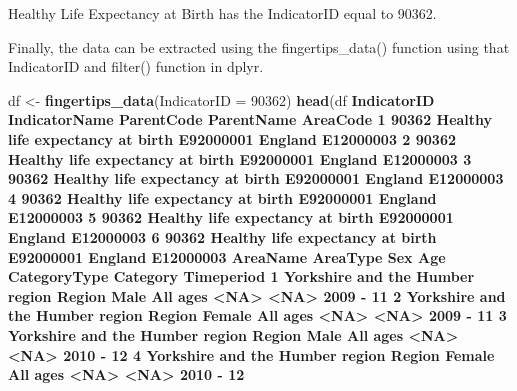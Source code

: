 \documentclass[]{book}
\newenvironment{Shaded}{\begin{snugshade}}{\end{snugshade}}
\newcommand{\DataTypeTok}[1]{\textcolor[rgb]{0.13,0.29,0.53}{#1}}
\newcommand{\DecValTok}[1]{\textcolor[rgb]{0.00,0.00,0.81}{#1}}
\newcommand{\ErrorTok}[1]{\textcolor[rgb]{0.64,0.00,0.00}{\textbf{#1}}}
\newcommand{\KeywordTok}[1]{\textcolor[rgb]{0.13,0.29,0.53}{\textbf{#1}}}
\newcommand{\NormalTok}[1]{#1}
\newcommand{\OperatorTok}[1]{\textcolor[rgb]{0.81,0.36,0.00}{\textbf{#1}}}
\newcommand{\OtherTok}[1]{\textcolor[rgb]{0.56,0.35,0.01}{#1}}
\newcommand{\StringTok}[1]{\textcolor[rgb]{0.31,0.60,0.02}{#1}}
\begin{document}
Healthy Life Expectancy at Birth has the IndicatorID equal to 90362.

Finally, the data can be extracted using the fingertips\_data() function using that IndicatorID and filter() function in dplyr.

\begin{Shaded}
\begin{Highlighting}[]
\NormalTok{df <-}\StringTok{ }\KeywordTok{fingertips_data}\NormalTok{(}\DataTypeTok{IndicatorID =} \DecValTok{90362}\NormalTok{)}
\KeywordTok{head}\NormalTok{(df }\OperatorTok{%>%}\StringTok{ }\KeywordTok{filter}\NormalTok{(AreaName }\OperatorTok{==}\StringTok{ "Yorkshire and the Humber region"}\NormalTok{))}
\NormalTok{  IndicatorID                    IndicatorName ParentCode ParentName  AreaCode}
\DecValTok{1}       \DecValTok{90362}\NormalTok{ Healthy life expectancy at birth  E92000001    England E12000003}
\DecValTok{2}       \DecValTok{90362}\NormalTok{ Healthy life expectancy at birth  E92000001    England E12000003}
\DecValTok{3}       \DecValTok{90362}\NormalTok{ Healthy life expectancy at birth  E92000001    England E12000003}
\DecValTok{4}       \DecValTok{90362}\NormalTok{ Healthy life expectancy at birth  E92000001    England E12000003}
\DecValTok{5}       \DecValTok{90362}\NormalTok{ Healthy life expectancy at birth  E92000001    England E12000003}
\DecValTok{6}       \DecValTok{90362}\NormalTok{ Healthy life expectancy at birth  E92000001    England E12000003}
\NormalTok{                         AreaName AreaType    Sex      Age CategoryType Category Timeperiod}
\DecValTok{1}\NormalTok{ Yorkshire and the Humber region   Region   Male All ages         }\OperatorTok{<}\OtherTok{NA}\OperatorTok{>}\StringTok{     }\ErrorTok{<}\OtherTok{NA}\OperatorTok{>}\StringTok{  }\DecValTok{2009} \OperatorTok{-}\StringTok{ }\DecValTok{11}
\DecValTok{2}\NormalTok{ Yorkshire and the Humber region   Region Female All ages         }\OperatorTok{<}\OtherTok{NA}\OperatorTok{>}\StringTok{     }\ErrorTok{<}\OtherTok{NA}\OperatorTok{>}\StringTok{  }\DecValTok{2009} \OperatorTok{-}\StringTok{ }\DecValTok{11}
\DecValTok{3}\NormalTok{ Yorkshire and the Humber region   Region   Male All ages         }\OperatorTok{<}\OtherTok{NA}\OperatorTok{>}\StringTok{     }\ErrorTok{<}\OtherTok{NA}\OperatorTok{>}\StringTok{  }\DecValTok{2010} \OperatorTok{-}\StringTok{ }\DecValTok{12}
\DecValTok{4}\NormalTok{ Yorkshire and the Humber region   Region Female All ages         }\OperatorTok{<}\OtherTok{NA}\OperatorTok{>}\StringTok{     }\ErrorTok{<}\OtherTok{NA}\OperatorTok{>}\StringTok{  }\DecValTok{2010} \OperatorTok{-}\StringTok{ }\DecValTok{12}
}
\end{Highlighting}
\end{Shaded}
\end{document}
